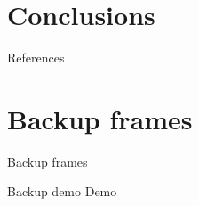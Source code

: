 \documentclass[aspectratio=169]{beamer}
\begin{document}
\begin{frame}
\begin{columns}
\begin{column}{0.4\linewidth}
        \end{column}
    \end{columns}
\end{frame}

\section{Conclusions}
\begin{frame}
    \cite{mme}
\end{frame}

\appendix
\begin{frame}{References}
    \printbibliography
\end{frame}

\section*{Backup frames}
\begin{frame}
    \centering
    \vfill
    { Backup frames}
    \vfill
\end{frame}

\begin{frame}{Backup demo}
    Demo
\end{frame}
\end{document}
